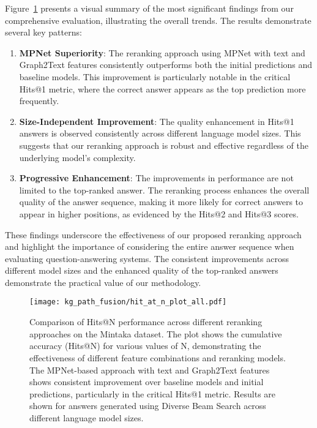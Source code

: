Figure~\ref{fig:controllable_fusion:hit_at_n_plot_all} presents a visual summary of the most significant findings from our comprehensive evaluation, illustrating the overall trends. The results demonstrate several key patterns:

\begin{enumerate}
    \item \textbf{MPNet Superiority}: The reranking approach using MPNet with text and Graph2Text features consistently outperforms both the initial predictions and baseline models. This improvement is particularly notable in the critical Hits@1 metric, where the correct answer appears as the top prediction more frequently.
    
    \item \textbf{Size-Independent Improvement}: The quality enhancement in Hits@1 answers is observed consistently across different language model sizes. This suggests that our reranking approach is robust and effective regardless of the underlying model's complexity.
    
    \item \textbf{Progressive Enhancement}: The improvements in performance are not limited to the top-ranked answer. The reranking process enhances the overall quality of the answer sequence, making it more likely for correct answers to appear in higher positions, as evidenced by the Hits@2 and Hits@3 scores.
\end{enumerate}

These findings underscore the effectiveness of our proposed reranking approach and highlight the importance of considering the entire answer sequence when evaluating question-answering systems. The consistent improvements across different model sizes and the enhanced quality of the top-ranked answers demonstrate the practical value of our methodology.

\begin{figure}[htbp]
   \centering
   \texttt{[image: kg\_path\_fusion/hit\_at\_n\_plot\_all.pdf]}
   \caption{Comparison of Hits@N performance across different reranking approaches on the Mintaka dataset. The plot shows the cumulative accuracy (Hits@N) for various values of N, demonstrating the effectiveness of different feature combinations and reranking models. The MPNet-based approach with text and Graph2Text features shows consistent improvement over baseline models and initial predictions, particularly in the critical Hits@1 metric. Results are shown for answers generated using Diverse Beam Search across different language model sizes.}
   \label{fig:controllable_fusion:hit_at_n_plot_all}
\end{figure}

